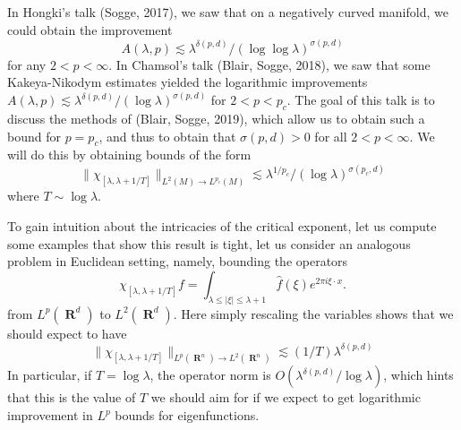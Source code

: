 \documentclass{article}
\DeclareMathOperator{\RR}{\mathbf{R}}
\theoremstyle{plain}
\theoremstyle{remark}
\theoremstyle{definition}
\begin{document}
In Hongki's talk (Sogge, 2017), we saw that on a negatively curved manifold, we could obtain the improvement
%
\[ A(\lambda,p) \lesssim \lambda^{\delta(p,d)} / (\log \log \lambda)^{\sigma(p,d)} \]
%
for any $2 < p < \infty$. In Chamsol's talk (Blair, Sogge, 2018), we saw that some Kakeya-Nikodym estimates yielded the logarithmic improvements $A(\lambda,p) \lesssim \lambda^{\delta(p,d)} / (\log \lambda)^{\sigma(p,d)}$ for $2 < p < p_c$. The goal of this talk is to discuss the methods of (Blair, Sogge, 2019), which allow us to obtain such a bound for $p = p_c$, and thus to obtain that $\sigma(p,d) > 0$ for all $2 < p < \infty$. We will do this by obtaining bounds of the form
%
\[ \| \chi_{[\lambda,\lambda + 1/T]} \|_{L^2(M) \to L^{p_c}(M)} \lesssim \lambda^{1/p_c} / (\log \lambda)^{\sigma(p_c,d)} \]
%
where $T \sim \log \lambda$.

To gain intuition about the intricacies of the critical exponent, let us compute some examples that show this result is tight, let us consider an analogous problem in Euclidean setting, namely, bounding the operators
%
\[ \chi_{[\lambda,\lambda+1/T]} f = \int_{\lambda \leq |\xi| \leq \lambda + 1} \widehat{f}(\xi) e^{2 \pi i \xi \cdot x}. \]
%
from $L^p(\RR^d)$ to $L^2(\RR^d)$. Here simply rescaling the variables shows that we should expect to have
%
\[ \| \chi_{[\lambda,\lambda+1/T]} \|_{L^p(\RR^n) \to L^2(\RR^n)} \lesssim (1/T) \lambda^{\delta(p,d)} \]
%
In particular, if $T = \log \lambda$, the operator norm is $O(\lambda^{\delta(p,d)} / \log \lambda)$, which hints that this is the value of $T$ we should aim for if we expect to get logarithmic improvement in $L^p$ bounds for eigenfunctions.
\end{document}
